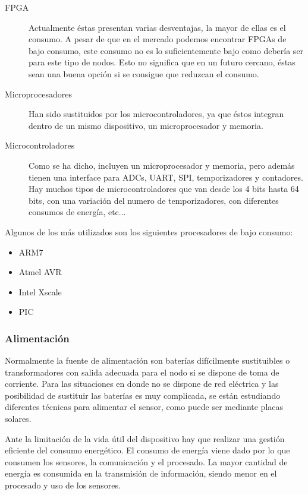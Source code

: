 \begin{description}
	\item[FPGA]
	Actualmente \'estas presentan varias desventajas, la mayor de ellas es el consumo. A pesar de que en el mercado podemos encontrar FPGAs de bajo consumo, este consumo no es lo suficientemente bajo como deber\'ia ser para este tipo de nodos. Esto no significa que en un futuro cercano, \'estas sean una buena opci\'on si se consigue que reduzcan el consumo.
	\item[Microprocesadores]
	Han sido sustituidos por los microcontroladores, ya que \'estos integran dentro de un mismo dispositivo, un microprocesador y memoria.
	\item[Microcontroladores]
	Como se ha dicho, incluyen un microprocesador y memoria, pero adem\'as tienen una interface para ADCs, UART, SPI, temporizadores y contadores. Hay muchos tipos de microcontroladores que van desde los 4 bits hasta 64 bits, con una variaci\'on del numero de temporizadores, con diferentes consumos de energ\'ia, etc...
\end{description}
 

Algunos de los m\'as utilizados son los siguientes procesadores de bajo consumo:

\begin{itemize}
\item ARM7
\item Atmel AVR
\item Intel Xscale
\item PIC
\end{itemize}


\subsubsection{Alimentaci\'on}
Normalmente la fuente de alimentaci\'on son bater\'ias dif\'icilmente sustituibles o transformadores con salida adecuada para el nodo si se dispone de toma de corriente. Para las situaciones en donde no se dispone de red el\'ectrica y las posibilidad de sustituir las bater\'ias es muy complicada, se est\'an estudiando diferentes t\'ecnicas para alimentar el sensor, como puede ser mediante placas solares. 

Ante la limitaci\'on de la vida \'util del dispositivo hay que realizar una gesti\'on eficiente del consumo energ\'etico. El consumo de energ\'ia viene dado por lo que consumen los sensores, la comunicaci\'on y el procesado. La mayor cantidad de energ\'ia es consumida en la transmisi\'on de informaci\'on, siendo menor en el procesado y uso de los sensores.

